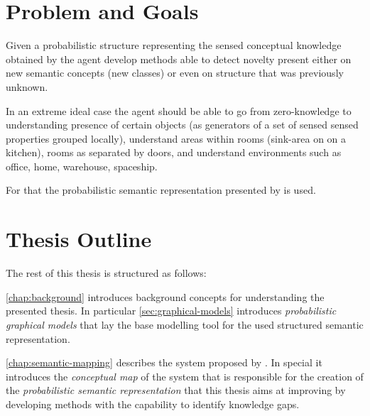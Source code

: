 \section{Problem and Goals}
%
Given a probabilistic structure representing the sensed conceptual knowledge
obtained by the agent develop methods able to detect novelty present
either on new semantic concepts (new classes) or even on structure that was
previously unknown.


In an extreme ideal case the agent should be able to go from zero-knowledge to
understanding presence of certain objects (as generators of a set of sensed
sensed properties grouped locally), understand areas within rooms (sink-area on
on a kitchen), rooms as separated by doors, and understand environments such
as office, home, warehouse, spaceship.


For that the probabilistic semantic representation presented by
\cite{andrzej2011phd} is used.

%



\section{Thesis Outline}
The rest of this thesis is structured as follows:

\autoref{chap:background} introduces background concepts for understanding the
presented thesis. In particular \autoref{sec:graphical-models} introduces
\emph{probabilistic graphical models} that lay the base modelling tool for
the used structured semantic representation.

\autoref{chap:semantic-mapping} describes the system proposed by
\cite{andrzej}. In special it introduces the \emph{conceptual map} of the system
that is responsible for the creation of the \emph{probabilistic semantic
representation} that this thesis aims at improving by developing methods with
the capability to identify knowledge gaps.

